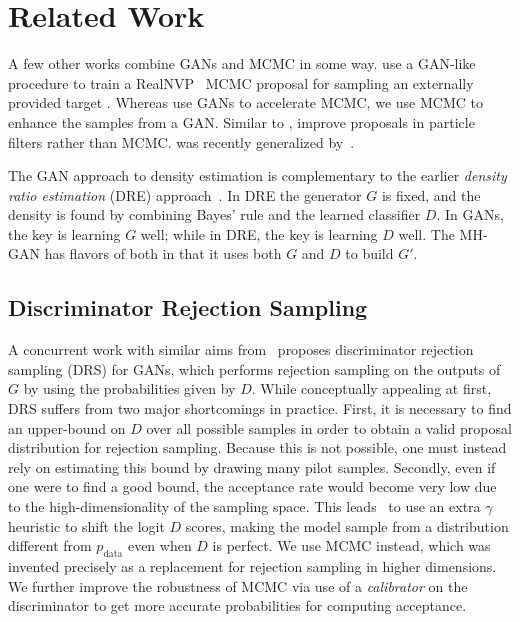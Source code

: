 \documentclass{article}
\newcommand{\target}{{p^\star}}
\newcommand{\PR}{{p_{\textrm{data}}}}
\begin{document}
\section{Related Work}
\label{sec:Related Work}

A few other works combine GANs and MCMC in some way.
\citet{Song2017} use a GAN-like procedure to train a RealNVP~\citep{Dinh2016} MCMC proposal for sampling an externally provided target \smash{$\target$}.
Whereas \citet{Song2017} use GANs to accelerate MCMC, we use MCMC to enhance the samples from a GAN\@.
Similar to \citet{Song2017}, \citet{Kempinska2017} improve proposals in particle filters rather than MCMC\@.
\citet{Song2017} was recently generalized by~\citet{Neklyudov2018}.

The GAN approach to density estimation is complementary to the earlier \emph{density ratio estimation} (DRE) approach~\citep{Sugiyama2012}\@.
In DRE the generator $G$ is fixed, and the density is found by combining Bayes' rule and the learned classifier $D$.
In GANs, the key is learning $G$ well; while in DRE, the key is learning $D$ well.
The MH-GAN has flavors of both in that it uses both $G$ and $D$ to build $G'$.

\subsection{Discriminator Rejection Sampling}
A concurrent work with similar aims from~\citet{Azadi2018} proposes discriminator rejection sampling (DRS) for GANs, which performs rejection sampling on the outputs of $G$ by using the probabilities given by $D$.
While conceptually appealing at first, DRS suffers from two major shortcomings in practice.
First, it is necessary to find an upper-bound on $D$ over all possible samples in order to obtain a valid proposal distribution for rejection sampling.
Because this is not possible, one must instead rely on estimating this bound by drawing many pilot samples.
Secondly, even if one were to find a good bound, the acceptance rate would become very low due to the high-dimensionality of the sampling space.
This leads~\citet{Azadi2018} to use an extra $\gamma$ heuristic to shift the logit $D$ scores, making the model sample from a distribution different from $\PR$ even when $D$ is perfect.
We use MCMC instead, which was invented precisely as a replacement for rejection sampling in higher dimensions.
We further improve the robustness of MCMC via use of a \emph{calibrator} on the discriminator to get more accurate probabilities for computing acceptance.  %
\end{document}
